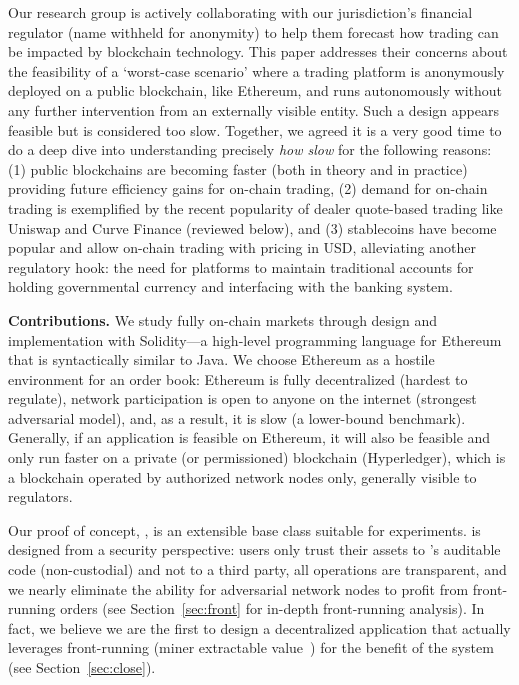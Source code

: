 Our research group is actively collaborating with our jurisdiction's financial regulator (name withheld for anonymity) to help them forecast how trading can be impacted by blockchain technology. This paper addresses their concerns about the feasibility of a `worst-case scenario' where a trading platform is anonymously deployed on a public blockchain, like Ethereum, and runs autonomously without any further intervention from an externally visible entity. Such a design appears feasible but is considered too slow. Together, we agreed it is a very good time to do a deep dive into understanding precisely \textit{how slow} for the following reasons: (1) public blockchains are becoming faster (both in theory and in practice) providing future efficiency gains for on-chain trading, (2) demand for on-chain trading is exemplified by the recent popularity of dealer quote-based trading like Uniswap and Curve Finance (reviewed below), and (3) stablecoins have become popular and allow on-chain trading with pricing in USD, alleviating another regulatory hook: the need for platforms to maintain traditional accounts for holding governmental currency and interfacing with the banking system.

\textbf{Contributions.} We study fully on-chain markets through design and implementation with Solidity---a high-level programming language for Ethereum that is syntactically similar to Java. We choose Ethereum as a hostile environment for an order book: Ethereum is fully decentralized (hardest to regulate), network participation is open to anyone on the internet (strongest adversarial model), and, as a result, it is slow (a lower-bound benchmark). Generally, if an application is feasible on Ethereum, it will also be feasible and only run faster on a private (or permissioned) blockchain (\eg Hyperledger), which is a blockchain operated by authorized network nodes only, generally visible to regulators.

Our proof of concept, \cm, is an extensible base class suitable for experiments. \cm is designed from a security perspective: users only trust their assets to \cm's auditable code (non-custodial) and not to a third party, all operations are transparent, and we nearly eliminate the ability for adversarial network nodes to profit from front-running orders (see Section~\ref{sec:front} for in-depth front-running analysis). In fact, we believe we are the first to design a decentralized application that actually leverages front-running (\ie miner extractable value~\cite{daian2019flash}) for the benefit of the system (see Section~\ref{sec:close}).

